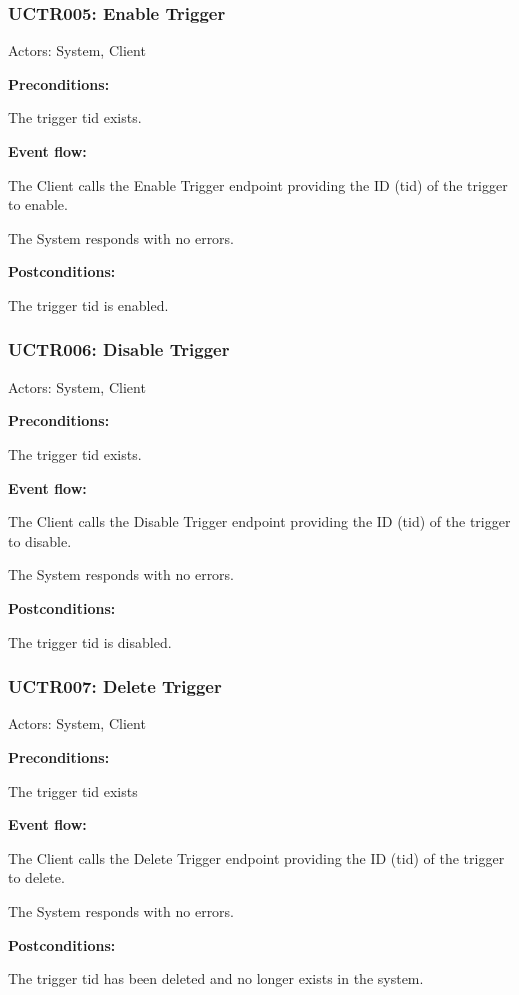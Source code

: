 \begin{ucbox}{\subsubsection{UCTR005: Enable Trigger}}
\label{UCTR005}

Actors: System, Client

\textbf{Preconditions:}

\ucitem The trigger tid exists.

\textbf{Event flow:}

\ucitem The Client calls the Enable Trigger endpoint providing the ID (tid) of the trigger to enable.

\ucitem The System responds with no errors.

\textbf{Postconditions:}

\ucitem The trigger tid is enabled.

\end{ucbox}

\begin{ucbox}{\subsubsection{UCTR006: Disable Trigger}}
\label{UCTR006}

Actors: System, Client

\textbf{Preconditions:}

\ucitem The trigger tid exists.

\textbf{Event flow:}

\ucitem The Client calls the Disable Trigger endpoint providing the ID (tid) of the trigger to disable.

\ucitem The System responds with no errors.

\textbf{Postconditions:}

\ucitem The trigger tid is disabled.

\end{ucbox}

\begin{ucbox}{\subsubsection{UCTR007: Delete Trigger}}
\label{UCTR007}

Actors: System, Client

\textbf{Preconditions:}

\ucitem The trigger tid exists

\textbf{Event flow:}

\ucitem The Client calls the Delete Trigger endpoint providing the ID (tid) of the trigger to delete.

\ucitem The System responds with no errors.

\textbf{Postconditions:}

\ucitem The trigger tid has been deleted and no longer exists in the system.

\end{ucbox}
\newpage